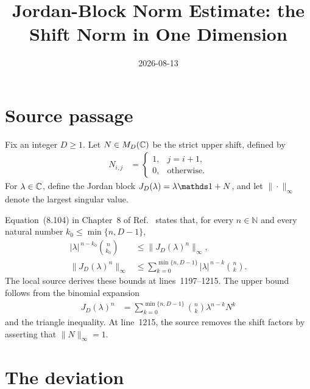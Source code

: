 \documentclass{article}
\title{Jordan-Block Norm Estimate: the Shift Norm in One Dimension}
\author{}
\date{2026-08-13}
\begin{document}
\maketitle
{}

\section{Source passage}

Fix an integer $D\geq 1$. Let $N\in M_{D}(\mathbb{C})$ be the strict upper shift, defined
by
\begin{align}
    N_{i,j}
        &=
        \begin{cases}
            1, & j=i+1,\\
            0, & \text{otherwise}.
        \end{cases}
    \label{eq:wolf_eq8104_shift_norm_one_dimensional_shift_definition}
\end{align}
For $\lambda\in\mathbb{C}$, define the Jordan block
$J_D(\lambda)=\lambda\Id+N$, and let $\|\cdot\|_{\infty}$ denote the largest
singular value.

Equation~(8.104) in Chapter~8 of Ref.~\cite{Wolf2012Quantum} states that, for
every $n\in\mathbb N$ and every natural number
$k_0\leq\min\{n,D-1\}$,
\begin{align}
    |\lambda|^{\,n-k_0}\binom{n}{k_0}
        &\leq \bigl\|J_D(\lambda)^n\bigr\|_{\infty},
    \label{eq:wolf_eq8104_shift_norm_one_dimensional_source_lower_bound}\\
    \bigl\|J_D(\lambda)^n\bigr\|_{\infty}
        &\leq
        \sum_{k=0}^{\min\{n,D-1\}}
            |\lambda|^{\,n-k}\binom{n}{k}.
    \label{eq:wolf_eq8104_shift_norm_one_dimensional_source_upper_bound}
\end{align}
The local source derives these bounds at lines~1197--1215. The upper bound
follows from the binomial expansion
\begin{align}
    J_D(\lambda)^n
        &=
        \sum_{k=0}^{\min\{n,D-1\}}
            \binom{n}{k}\lambda^{n-k}N^k
    \label{eq:wolf_eq8104_shift_norm_one_dimensional_binomial_expansion}
\end{align}
and the triangle inequality. At line~1215, the source removes the shift
factors by asserting that $\|N\|_{\infty}=1$.

\section{The deviation}
\end{document}
